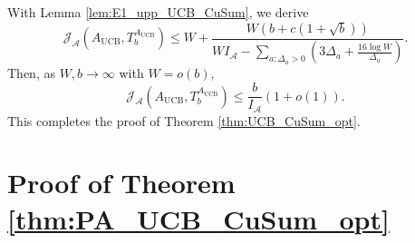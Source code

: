 \documentclass[letterpaper, 10 pt, conference]{ieeeconf}  %
\newcommand{\lp}{\left(}
\newcommand{\rp}{\right)}
\newcommand{\mcal}{\mathcal}
\newcommand{\mrm}{\mathrm}
\begin{document}
With Lemma \ref{lem:E1_upp_UCB_CuSum}, we derive
%
\begin{equation}
    \mcal{J}_{\mcal{A}} \lp A_{\mrm{UCB}}, T_{b}^{A_{\mrm{UCB}}} \rp \leq W + \frac{W \lp b + c \lp 1 + \sqrt{b} \rp \rp}{WI_{\mcal{A}} - \sum_{a: \Delta_{a} > 0} \lp 3\Delta_{a} + \frac{16 \log W}{\Delta_{a}} \rp}.
\end{equation}
%
Then, as $W, b \to \infty$ with $W = o(b)$,
%
\begin{equation}
     \mcal{J}_{\mcal{A}} \lp A_{\mrm{UCB}}, T_{b}^{A_{\mrm{UCB}}} \rp \leq \frac{b}{I_{\mcal{A}}} \lp 1 + o \lp 1 \rp \rp.
\end{equation}
%
This completes the proof of Theorem \ref{thm:UCB_CuSum_opt}.


\section{Proof of Theorem \ref{thm:PA_UCB_CuSum_opt}}
\label{sec:thm3}
\end{document}
